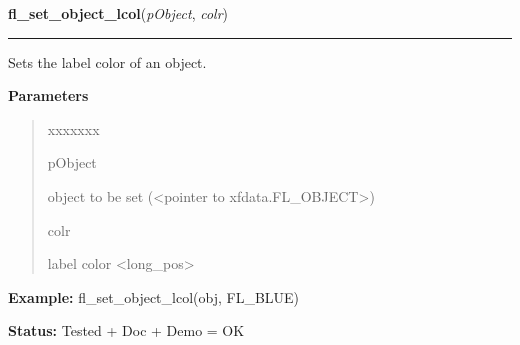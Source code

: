 \hspace{.8\funcindent}\begin{boxedminipage}{\funcwidth}

    \raggedright \textbf{fl\_set\_object\_lcol}(\textit{pObject}, \textit{colr})

    \vspace{-1.5ex}

    \rule{\textwidth}{0.5\fboxrule}
\setlength{\parskip}{2ex}
    Sets the label color of an object.

\setlength{\parskip}{1ex}
      \textbf{Parameters}
      \vspace{-1ex}

      \begin{quote}
        \begin{Ventry}{xxxxxxx}

          \item[pObject]

          object to be set ({\textless}pointer to 
          xfdata.FL\_OBJECT{\textgreater})

          \item[colr]

          label color {\textless}long\_pos{\textgreater}

        \end{Ventry}

      \end{quote}

\textbf{Example:} fl\_set\_object\_lcol(obj, FL\_BLUE)



\textbf{Status:} Tested + Doc + Demo = OK



    \end{boxedminipage}

    \label{xformslib:library:fl_set_object_lcol}

    \vspace{0.5ex}

